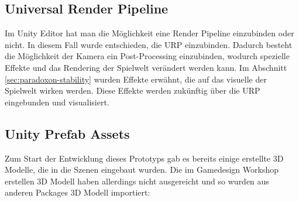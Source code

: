 \subsection{Universal Render Pipeline}
Im Unity Editor hat man die Möglichkeit eine Render Pipeline einzubinden oder nicht. In diesem Fall wurde entschieden, die \ac{URP} einzubinden. Dadurch besteht die Möglichkeit der Kamera ein Post-Processing einzubinden, wodurch spezielle Effekte und das Rendering der Spielwelt verändert werden kann. Im Abschnitt \ref{sec:paradoxon-stability}  wurden Effekte erwähnt, die auf das visuelle der Spielwelt wirken werden. Diese Effekte werden zukünftig über die \ac{URP} eingebunden und visualisiert.

\subsection{Unity Prefab Assets}\label{sec:extra-assets}
Zum Start der Entwicklung dieses Prototyps gab es bereits einige erstellte \ac{3D} Modelle, die in die Szenen eingebaut wurden. Die im Gamedesign Workshop erstellen \ac{3D} Modell haben allerdings nicht ausgereicht und so wurden aus anderen Packages \ac{3D} Modell importiert:





